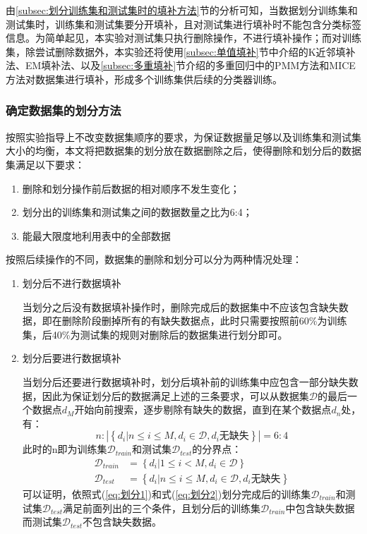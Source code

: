 \documentclass[a4paper]{ctexart}
\begin{document}
由\ref{subsec:划分训练集和测试集时的填补方法}节的分析可知，当数据划分训练集和测试集时，训练集和测试集要分开填补，且对测试集进行填补时不能包含分类标签信息。为简单起见，本实验对测试集只执行删除操作，不进行填补操作；而对训练集，除尝试删除数据外，本实验还将使用\ref{subsec:单值填补}节中介绍的K近邻填补法、EM填补法、以及\ref{subsec:多重填补}节介绍的多重回归中的PMM方法和MICE方法对数据集进行填补，形成多个训练集供后续的分类器训练。

\subsubsection{确定数据集的划分方法}\label{sec:确定数据集的划分方法}
按照实验指导上不改变数据集顺序的要求，为保证数据量足够以及训练集和测试集大小的均衡，本文将把数据集的划分放在数据删除之后，使得删除和划分后的数据集满足以下要求：
\begin{enumerate}
	\item 删除和划分操作前后数据的相对顺序不发生变化；
	\item 划分出的训练集和测试集之间的数据数量之比为6:4；
	\item 能最大限度地利用表中的全部数据
\end{enumerate}
按照后续操作的不同，数据集的删除和划分可以分为两种情况处理：
\begin{enumerate}
	\item 划分后不进行数据填补

	      当划分之后没有数据填补操作时，删除完成后的数据集中不应该包含缺失数据，即在删除阶段删掉所有的有缺失数据点，此时只需要按照前60\%为训练集，后40\%为测试集的规则对删除后的数据集进行划分即可。

	\item 划分后要进行数据填补

	      当划分后还要进行数据填补时，划分后填补前的训练集中应包含一部分缺失数据，因此为保证划分后的数据满足上述的三条要求，可以从数据集$\mathcal D$的最后一个数据点$d_M$开始向前搜索，逐步剔除有缺失的数据，直到在某个数据点$d_n$处，有：
	      \begin{equation}\label{eq:划分1}
		      n:|\left\{d_i|n\leq i\leq M,d_i\in\mathcal D,d_i\text{无缺失}\right\}|=6:4
	      \end{equation}
	      此时的n即为训练集$\mathcal D_{train}$和测试集$\mathcal D_{test}$的分界点：
	      \begin{equation}\label{eq:划分2}
		      \begin{split}
			      \mathcal D_{train}&=\left\{d_i|1\leq i< M,d_i\in\mathcal D\right\}\\
			      \mathcal D_{test}&=\left\{d_i|n\leq i\leq M,d_i\in\mathcal D,d_i\text{无缺失}\right\}
		      \end{split}
	      \end{equation}
	      可以证明，依照式(\ref{eq:划分1})和式(\ref{eq:划分2})划分完成后的训练集$\mathcal D_{train}$和测试集$\mathcal D_{test}$满足前面列出的三个条件，且划分后的训练集$\mathcal D_{train}$中包含缺失数据而测试集$\mathcal D_{test}$不包含缺失数据。
\end{enumerate}
\end{document}
